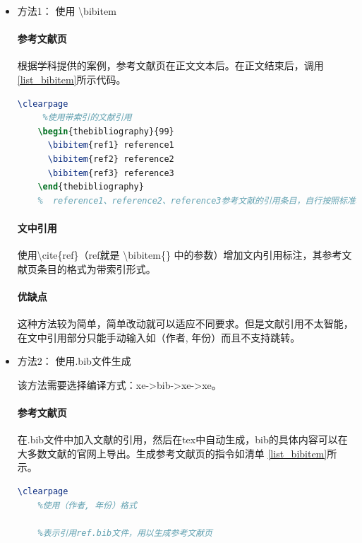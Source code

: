 \documentclass[AutoFakeBold]{ZafuThesis}
\begin{document}
\begin{itemize}
  \item 方法1： 使用 \textbackslash bibitem\par
  \paragraph{参考文献页}
  根据学科提供的案例，参考文献页在正文文本后。在正文结束后，调用 \ref{list_bibitem}所示代码。
  \begin{lstlisting}[language = tex,caption = 使用\textbackslash bibitem,label = list_bibitem]
    \clearpage
     %使用带索引的文献引用
    \begin{thebibliography}{99}
      \bibitem{ref1} reference1
      \bibitem{ref2} reference2
      \bibitem{ref3} reference3
    \end{thebibliography}
    %  reference1、reference2、reference3参考文献的引用条目，自行按照标准填写参考文献引用格式
  \end{lstlisting}

  \paragraph{文中引用}
  使用\textbackslash cite\{ref\}（ref就是 \textbackslash bibitem\{\} 中的参数）增加文内引用标注，其参考文献页条目的格式为带索引形式。
  \paragraph{优缺点}
  这种方法较为简单，简单改动就可以适应不同要求。但是文献引用不太智能，在文中引用部分只能手动输入如（作者, 年份）而且不支持跳转。

  \item 方法2： 使用.bib文件生成\par
  该方法需要选择编译方式：xe->bib->xe->xe。
  \paragraph{参考文献页}
  在.bib文件中加入文献的引用，然后在tex中自动生成，bib的具体内容可以在大多数文献的官网上导出。生成参考文献页的指令如清单 \ref{list_bibitem}所示。
  \begin{lstlisting}[language = tex,caption = 使用\textbackslash bibitem,label = list_bibitem]
    \clearpage
    %使用（作者, 年份）格式
     
    %表示引用ref.bib文件，用以生成参考文献页
    
  \end{lstlisting}\par


\end{itemize}
\end{document}
